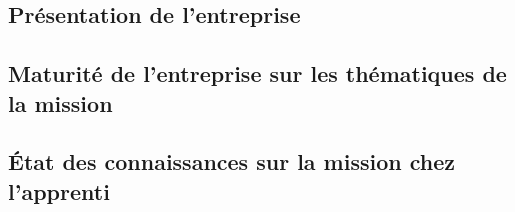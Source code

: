 \documentclass[a4paper, 12pt]{article}
\begin{document}

%     


\subsection{Présentation de l'entreprise}

    
    \newpage{}


\subsection{Maturité de l’entreprise sur les thématiques de la mission}


    
    \newpage{}


\subsection{État des connaissances sur la mission chez l’apprenti}

\end{document}
